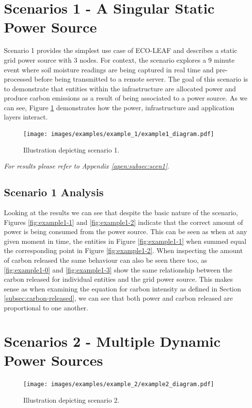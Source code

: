 \documentclass{l4proj}
\begin{document}
\section{Scenarios 1 - A Singular Static Power Source}\label{eval:subsec:scenario1}
Scenario 1 provides the simplest use case of ECO-LEAF and describes a static grid power source with 3 nodes.
For context, the scenario explores a 9 minute event where soil moisture readings are being captured in real time and pre-processed before being transmitted to a remote server.
The goal of this scenario is to demonstrate that entities within the infrastructure are allocated power and  produce carbon emissions as a result of being associated to a power source.
As we can see, Figure \ref{fig:example1_diagram} demonstrates how the power, infrastructure and application layers interact.

\begin{figure}[h]
    \centering
    \texttt{[image: images/examples/example\_1/example1\_diagram.pdf]}
    ~
    \caption{Illustration depicting scenario 1.}
    \label{fig:example1_diagram}
\end{figure}

\textit{For results please refer to Appendix \ref{apen:subsec:scen1}}.\\

\subsection{Scenario 1 Analysis}
Looking at the results we can see that despite the basic nature of the scenario, Figures \ref{fig:example1-1} and \ref{fig:example1-2} indicate that the correct amount of power is being consumed from the power source.
This can be seen as when at any given moment in time, the entities in Figure \ref{fig:example1-1} when summed equal the corresponding point in Figure \ref{fig:example1-2}.
When inspecting the amount of carbon released the same behaviour can also be seen there too, as \ref{fig:example1-0} and \ref{fig:example1-3} show the same relationship between the carbon released for individual entities and the grid power source.
This makes sense as when examining the equation for carbon intensity as defined in Section \ref{subsec:carbon-released}, we can see that both power and carbon released are proportional to one another.

\section{Scenarios 2 - Multiple Dynamic Power Sources}\label{eval:subsec:scenario2}
\begin{figure}[h]
    \centering
    \texttt{[image: images/examples/example\_2/example2\_diagram.pdf]}
    ~
    \caption{Illustration depicting scenario 2.}
    \label{fig:example2_diagram}
\end{figure}
\end{document}
